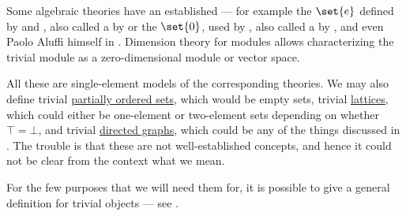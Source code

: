 \begin{remark}\label{rem:trivial_object}
  Some algebraic theories have an established  --- for example the  \( \set{ e } \) defined by  and , also called a  by  or the  \( \set{ 0 } \), used by , also called a  by ,  and even Paolo Aluffi himself in \cite[341]{Aluffi2009}. Dimension theory for modules allows characterizing the trivial module as a zero-dimensional module or vector space.

  All these are single-element models of the corresponding theories. We may also define trivial \hyperref[def:partially_ordered_set]{partially ordered sets}, which would be empty sets, trivial \hyperref[def:semilattice/lattice]{lattices}, which could either be one-element or two-element sets depending on whether \( \top = \bot \), and trivial \hyperref[def:directed_graph]{directed graphs}, which could be any of the things discussed in . The trouble is that these are not well-established concepts, and hence it could not be clear from the context what we mean.

  For the few purposes that we will need them for, it is possible to give a general definition for trivial objects --- see .
\end{remark}


